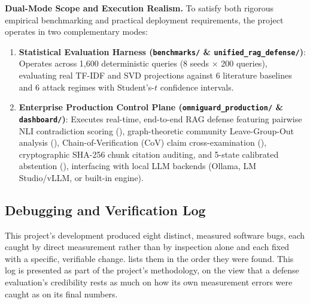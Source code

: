 \textbf{Dual-Mode Scope and Execution Realism.}
To satisfy both rigorous empirical benchmarking and practical deployment requirements, the project operates in two complementary modes:
\begin{enumerate}
\item \textbf{Statistical Evaluation Harness (\texttt{benchmarks/} \& \texttt{unified\_rag\_defense/})}:
  Operates across 1,600 deterministic queries (8 seeds $\times$ 200 queries), evaluating real TF-IDF and SVD projections against 6 literature baselines and 6 attack regimes with Student's-$t$ confidence intervals.
\item \textbf{Enterprise Production Control Plane (\texttt{omniguard\_production/} \& \texttt{dashboard/})}:
  Executes real-time, end-to-end RAG defense featuring pairwise NLI contradiction scoring (), graph-theoretic community Leave-Group-Out analysis (), Chain-of-Verification (CoV) claim cross-examination (), cryptographic SHA-256 chunk citation auditing, and 5-state calibrated abstention (), interfacing with local LLM backends (Ollama, LM Studio/vLLM, or built-in engine).
\end{enumerate}

\subsection{Debugging and Verification Log}
\label{sec:debugging}

This project's development produced eight distinct, measured software
bugs, each caught by direct measurement rather than by inspection alone
and each fixed with a specific, verifiable change. 
lists them in the order they were found. This log is presented as part of
the project's methodology, on the view that a defense evaluation's
credibility rests as much on how its own measurement errors were caught
as on its final numbers.

